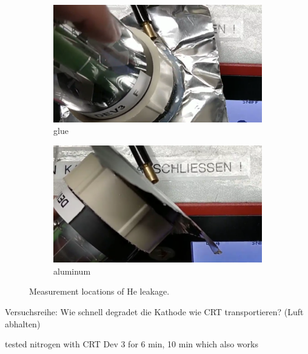 \begin{figure}[h]
	\begin{subfigure}[b]{0.4\textwidth}
		\includegraphics[width=\textwidth]{./Chapters/CRT-handling/glue}
		\caption{glue}
	\end{subfigure}
	\hspace{0.1\textwidth}
	\begin{subfigure}[b]{0.4\textwidth}
		\includegraphics[width=\textwidth]{./Chapters/CRT-handling/aluminum_foil}
		\caption{aluminum}
	\end{subfigure}
	
	\caption{Measurement locations of He leakage.}
	\label{fig:Measurement locatiosn of He leakage}
\end{figure}
 
Versuchsreihe: Wie schnell degradet die Kathode
wie CRT transportieren? (Luft abhalten)

tested nitrogen with CRT Dev 3 for 6 min, 10 min which also works


